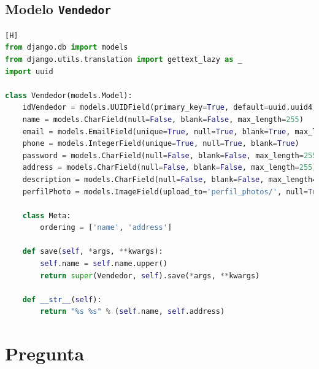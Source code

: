 \documentclass{article}
\begin{document}
\subsection*{Modelo \texttt{Vendedor}}
		  \begin{lstlisting}[language=Python,caption={Vendedor.py}][H]
from django.db import models
from django.utils.translation import gettext_lazy as _
import uuid

class Vendedor(models.Model):
    idVendedor = models.UUIDField(primary_key=True, default=uuid.uuid4, editable=False)
    name = models.CharField(null=False, blank=False, max_length=255)
    email = models.EmailField(unique=True, null=True, blank=True, max_length=255)
    phone = models.IntegerField(unique=True, null=True, blank=True)
    password = models.CharField(null=False, blank=False, max_length=255)
    address = models.CharField(null=False, blank=False, max_length=255)
    description = models.CharField(null=False, blank=False, max_length=255)
    perfilPhoto = models.ImageField(upload_to='perfil_photos/', null=True, blank=True)

    class Meta:
        ordering = ['name', 'address']

    def save(self, *args, **kwargs):
        self.name = self.name.upper()
        return super(Vendedor, self).save(*args, **kwargs)

    def __str__(self):
        return "%s %s" % (self.name, self.address)
    \end{lstlisting}




	\section{Pregunta}
\end{document}
